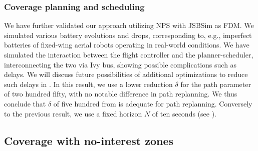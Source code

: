 \subsubsection*{Coverage planning and scheduling}

We have further validated our approach utilizing NPS with JSBSim as FDM. We simulated various battery evolutions and drops, corresponding to, e.g., imperfect batteries of fixed-wing aerial robots operating in real-world conditions. We have simulated the interaction between the flight controller and the planner-scheduler, interconnecting the two via Ivy bus, showing possible complications such as delays. We will discuss future possibilities of additional optimizations to reduce such delays in . In this result, we use a lower reduction $\delta$ for the path parameter of two hundred fifty, with no notable difference in path replanning. We thus conclude that $\delta$ of five hundred from  is adequate for path replanning. Conversely to the previous result, we use a fixed horizon $N$ of ten seconds (see ).

\subsection{Coverage with no-interest zones}
\label{sec:res-obsta}

